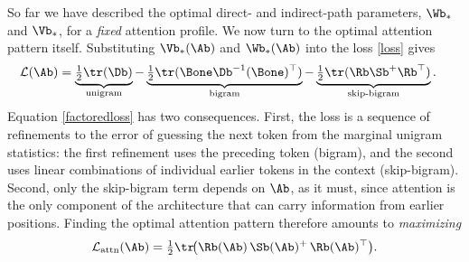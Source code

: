 \documentclass{article}
\begin{document}


So far we have described the optimal direct- and indirect-path parameters,
$\Wb_*$ and $\Vb_*$, for a \emph{fixed} attention profile. We now turn to the
optimal attention pattern itself. Substituting $\Vb_*(\Ab)$ and $\Wb_*(\Ab)$
into the loss \eqref{loss} gives
\begin{align}\label{factoredloss}
    \mathcal{L}(\Ab) &= \underbrace{\tfrac{1}{2}\tr(\Db)}_{\text{unigram}}
    - \underbrace{\tfrac{1}{2}\tr(\Bone \Db^{-1}(\Bone)^\top)}_{\text{bigram}}
    - \underbrace{\tfrac{1}{2}\tr(\Rb \Sb^+\Rb^\top)}_{\text{skip-bigram}}.
\end{align}
Equation \eqref{factoredloss} has two consequences. First, the loss is a
sequence of refinements to the error of guessing the next token from the
marginal unigram statistics: the first refinement uses the preceding token
(bigram), and the second uses linear combinations of individual earlier tokens
in the context (skip-bigram). Second, only the skip-bigram term depends on
$\Ab$, as it must, since attention is the only component of the architecture
that can carry information from earlier positions. Finding the optimal
attention pattern therefore amounts to \emph{maximizing}
\begin{equation}\label{lattn}
    \mathcal{L}_{\text{attn}}(\Ab)
    = \tfrac{1}{2}\tr\!\big(\Rb(\Ab)\,\Sb(\Ab)^+\,\Rb(\Ab)^\top\big).
\end{equation}
\end{document}
